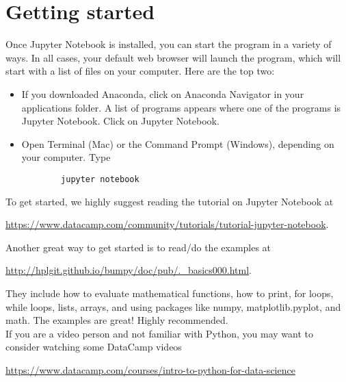 \documentclass[addpoints]{exam}
\begin{document}
\section{Getting started}
Once Jupyter Notebook is installed, you can start the program in a variety of ways.  In all cases, your default web browser will launch the program, which will start with a list of files on your computer.  Here are the top two:
\begin{itemize}
    \item If you downloaded Anaconda, click on Anaconda Navigator in your applications folder.  A list of programs appears where one of the programs is Jupyter Notebook.  Click on Jupyter Notebook.  
    \item Open Terminal (Mac) or the Command Prompt (Windows), depending on your computer.  Type 
    \begin{verbatim}
        jupyter notebook
    \end{verbatim}
\end{itemize}
To get started, we highly suggest reading the tutorial on Jupyter Notebook at
\begin{center}
    \href{https://www.datacamp.com/community/tutorials/tutorial-jupyter-notebook}{https://www.datacamp.com/community/tutorials/tutorial-jupyter-notebook}.
\end{center}
Another great way to get started is to read/do the examples at
\begin{center}
    \href{http://hplgit.github.io/bumpy/doc/pub/._basics000.html}{http://hplgit.github.io/bumpy/doc/pub/.\_basics000.html}.
\end{center}
They include how to evaluate mathematical functions, how to print, for loops, while loops, lists, arrays, and using packages like numpy, matplotlib.pyplot, and math.  The examples are great! Highly recommended.\\

If you are a video person and not familiar with Python, you may want to consider watching some DataCamp videos
\begin{center}
    \href{https://www.datacamp.com/courses/intro-to-python-for-data-science}{https://www.datacamp.com/courses/intro-to-python-for-data-science}
\end{center}
\end{document}
